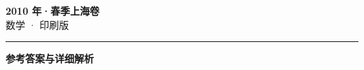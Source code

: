 \documentclass[zihao=5, a4paper]{ctexart}
\begin{document}
\begin{center}
  {\Large\bfseries 2010 年·春季上海卷}\\[4pt]
  {\large 数学 · 印刷版}
\end{center}
\medskip
{}

\par\bigskip\hrule\bigskip
{}
\begin{center}{\large\bfseries 参考答案与详细解析}\end{center}
\smallskip

\end{document}
